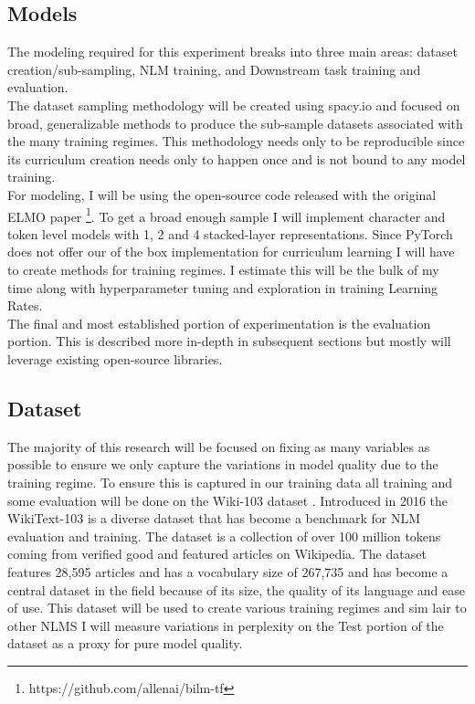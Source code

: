 \documentclass[11pt,a4paper]{article}
\begin{document}
\subsection{Models}
The modeling required for this experiment breaks into three main areas: dataset creation/sub-sampling, NLM training, and Downstream task training and evaluation. \\
The dataset sampling methodology will be created using spacy.io and focused on broad, generalizable methods to produce the sub-sample datasets associated with the many training regimes. This methodology needs only to be reproducible since its curriculum creation needs only to happen once and is not bound to any model training. \\ For modeling, I will be using the open-source code released with the original ELMO paper \footnote{https://github.com/allenai/bilm-tf}. To get a broad enough sample I will implement character and token level models with 1, 2 and 4 stacked-layer representations. Since PyTorch does not offer our of the box implementation for curriculum learning I will have to create methods for training regimes. I estimate this will be the bulk of my time along with hyperparameter tuning and exploration in training Learning Rates. \\
The final and most established portion of experimentation is the evaluation portion. This is described more in-depth in subsequent sections but mostly will leverage existing open-source libraries.
\subsection{Dataset}
The majority of this research will be focused on fixing as many variables as possible to ensure we only capture the variations in model quality due to the training regime. To ensure this is captured in our training data all training and some evaluation will be done on the Wiki-103 dataset \cite{Merity2016PointerSM}. Introduced in 2016 the WikiText-103 is a diverse dataset that has become a benchmark for NLM evaluation and training. The dataset is a collection of over 100 million tokens coming from verified good and featured articles on Wikipedia. The dataset features 28,595 articles and has a vocabulary size of 267,735 and has become a central dataset in the field because of its size, the quality of its language and ease of use. This dataset will be used to create various training regimes and sim lair to other NLMS I will measure variations in perplexity on the Test portion of the dataset as a proxy for pure model quality. 
\end{document}
